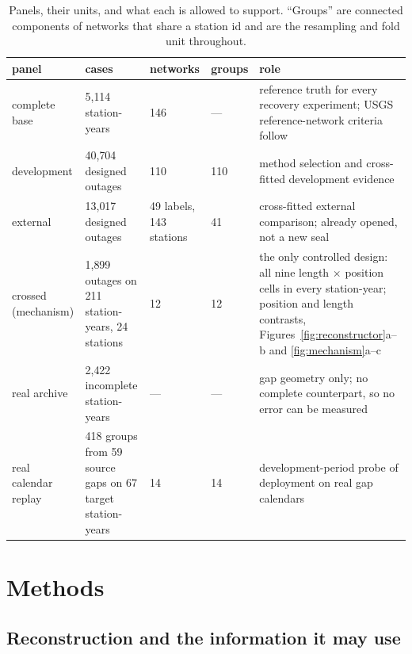\documentclass[draft]{agujournal2025}
\newcommand{\tabletext}{%
  \footnotesize
  \setlength{\baselineskip}{10pt}%
  \setlength{\parindent}{0pt}%
}
\begin{document}
\begin{table}
\caption{Panels, their units, and what each is allowed to support. ``Groups''
are connected components of networks that share a station id and are the
resampling and fold unit throughout.}
\label{tab:panels}
\tabletext
\centering
\begin{tabularx}{\textwidth}{Y{0.95}Y{0.85}Y{0.80}Y{0.55}Y{1.85}}
\hline
panel & cases & networks & groups & role \\
\hline
complete base & 5{,}114 station-years & 146 & --- & reference truth for every recovery experiment; USGS reference-network criteria follow \cite{falcone2011} \\
development & 40{,}704 designed outages & 110 & 110 & method selection and cross-fitted development evidence \\
external & 13{,}017 designed outages & 49 labels, 143 stations & 41 & cross-fitted external comparison; already opened, not a new seal \\
crossed (mechanism) & 1{,}899 outages on 211 station-years, 24 stations & 12 & 12 & the only controlled design: all nine length $\times$ position cells in every station-year; position and length contrasts, Figures~\ref{fig:reconstructor}a--b and \ref{fig:mechanism}a--c \\
real archive & 2{,}422 incomplete station-years & --- & --- & gap geometry only; no complete counterpart, so no error can be measured \\
real calendar replay & 418 groups from 59 source gaps on 67 target station-years & 14 & 14 & development-period probe of deployment on real gap calendars \\
\hline
\end{tabularx}
\end{table}

\section{Methods}

\subsection{Reconstruction and the information it may use}
\end{document}
